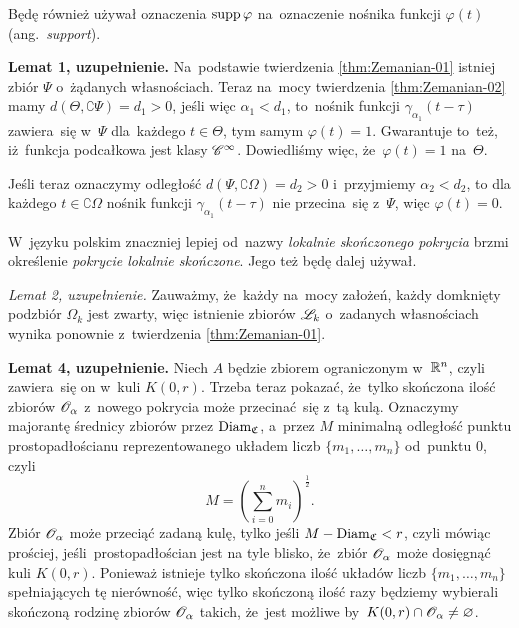 \documentclass[a4paper,11pt]{article}
\begin{document}
Będę również używał oznaczenia $\operatorname{supp} \varphi$ na~oznaczenie nośnika
funkcji $\varphi( t )$ (ang.~\textit{support}).

\VerSpaceFour





\noindent
{} \textbf{Lemat 1, uzupełnienie.} Na~podstawie twierdzenia
\eqref{thm:Zemanian-01} istniej zbiór $\Psi$ o~żądanych własnościach. Teraz
na~mocy twierdzenia \eqref{thm:Zemanian-02} mamy
$d( \Theta, \complement \Psi ) = d_{ 1 } > 0$, jeśli więc $\alpha_{ 1 } < d_{ 1 }$, to~nośnik funkcji
$\gamma_{ \alpha_{ 1 } }( t - \tau )$ zawiera~się w~$\Psi$ dla~każdego $t \in \Theta$, tym samym
$\varphi( t ) = 1$. Gwarantuje to~też, iż~funkcja podcałkowa jest klasy
$\mathcal{C}^{ \infty }$. Dowiedliśmy więc, że~$\varphi( t ) = 1$ na~$\Theta$.

Jeśli teraz oznaczymy odległość $d( \Psi, \complement \Omega ) = d_{ 2 } > 0$ i~przyjmiemy
$\alpha_{ 2 } < d_{ 2 }$, to dla każdego $t \in \complement \Omega$ nośnik funkcji
$\gamma_{ \alpha_{ 1 } }( t - \tau )$ nie przecina~się z~$\Psi$, więc $\varphi( t ) = 0$.

\VerSpaceFour





\noindent
{} W~języku polskim znaczniej lepiej od~nazwy
\textit{lokalnie skończonego pokrycia} brzmi określenie \textit{pokrycie
  lokalnie skończone}. Jego też będę dalej używał.

\VerSpaceFour





\noindent
{} \textit{Lemat 2, uzupełnienie.} Zauważmy, że~każdy na~mocy
założeń, każdy domknięty podzbiór $\Omega_{ k }$ jest zwarty, więc
istnienie zbiorów $\mathcal{L}_{ k }$ o~zadanych własnościach wynika ponownie
z~twierdzenia \eqref{thm:Zemanian-01}.

\VerSpaceFour





\noindent
{} \textbf{Lemat 4, uzupełnienie.} Niech $A$ będzie zbiorem
ograniczonym w~$\mathbb{R}^{ n }$, czyli zawiera~się on w~kuli $K( 0, r )$. Trzeba
teraz pokazać, że~tylko skończona ilość zbiorów $\mathcal{O}_{ \alpha }$ z~nowego
pokrycia może przecinać~się z~tą kulą. Oznaczymy majorantę średnicy
zbiorów przez $\operatorname{Diam}_{ \mathfrak{C} }$, a~przez $M$ minimalną
odległość punktu prostopadłościanu reprezentowanego układem liczb
$\{ m_{ 1 }, \ldots, m_{ n } \}$ od~punktu $0$, czyli
\begin{equation}
  \label{eq:Zemanian-06}
  M = \left( \sum_{ i = 0 }^{ n } m_{ i } \right)^{ \frac{ 1 }{ 2 } }.
\end{equation}
Zbiór $\mathcal{O}_{ \alpha }$ może przeciąć zadaną kulę, tylko jeśli
$M - \operatorname{Diam}_{ \mathfrak{C} } < r$, czyli mówiąc prościej,
jeśli~prostopadłościan jest na tyle blisko, że~zbiór $\mathcal{O}_{ \alpha }$
może dosięgnąć kuli $K( 0, r )$. Ponieważ istnieje tylko skończona
ilość układów liczb $\{ m_{ 1 }, \ldots, m_{ n } \}$ spełniających tę
nierówność, więc tylko skończoną ilość razy będziemy wybierali
skończoną rodzinę zbiorów $\mathcal{O}_{ \alpha }$ takich, że~jest możliwe
by~$K( 0, r ) \cap \mathcal{O}_{ \alpha } \neq \varnothing$.
\end{document}
